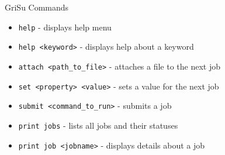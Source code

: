\documentclass[final,t]{beamer}
\begin{document}
\begin{frame}[fragile]{}
\begin{columns}[t]
\begin{column}{.35\linewidth}
      \begin{block}{GriSu Commands}
        \begin{itemize}
        \item \verb|help| - displays help menu
        \item \verb|help <keyword>| - displays help about a keyword
        \item \verb|attach <path_to_file>| - attaches a file to the next job
        \item \verb|set <property> <value>| - sets a value for the next job
        \item \verb|submit <command_to_run>| - submits a job
        \item \verb|print jobs| - lists all jobs and their statuses
        \item \verb|print job <jobname>| - displays details about a job
        \end{itemize}
      \end{block}
      
    \end{column}
  \end{columns}
\end{frame}
\end{document}
